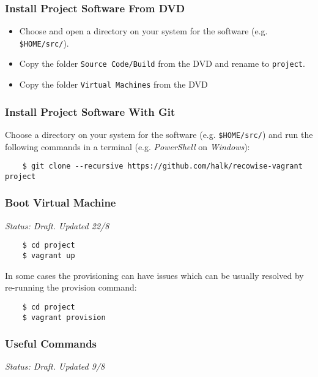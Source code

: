 \subsubsection{Install Project Software From DVD}

\begin{itemize}
\item Choose and open a directory on your system for the software (e.g. \texttt{\$HOME/src/}).
\item Copy the folder \texttt{Source Code/Build} from the DVD and rename to \texttt{project}.
\item Copy the folder \texttt{Virtual Machines} from the DVD
\end{itemize}

\subsubsection{Install Project Software With Git}

Choose a directory on your system for the software (e.g. \texttt{\$HOME/src/}) and run the following commands in a terminal (e.g. \emph{PowerShell} on \emph{Windows}):

\begin{verbatim}
    $ git clone --recursive https://github.com/halk/recowise-vagrant project
\end{verbatim}

\subsubsection{Boot Virtual Machine}

\emph{Status: Draft. Updated 22/8}

\begin{verbatim}
    $ cd project
    $ vagrant up
\end{verbatim}

In some cases the provisioning can have issues which can be usually resolved by re-running the provision command:

\begin{verbatim}
    $ cd project
    $ vagrant provision
\end{verbatim}

\subsubsection{Useful Commands}

\emph{Status: Draft. Updated 9/8}

